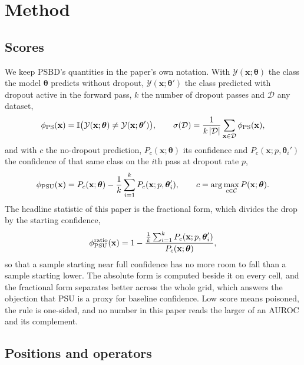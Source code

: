 \documentclass[../main.tex]{subfiles}
\begin{document}
\section{Method}

\subsection{Scores}

We keep PSBD's quantities in the paper's own notation. With $\mathcal{Y}(\mathbf{x};\boldsymbol\theta)$ the class the model $\boldsymbol\theta$ predicts without dropout, $\mathcal{Y}(\mathbf{x};\boldsymbol\theta')$ the class predicted with dropout active in the forward pass, $k$ the number of dropout passes and $\mathcal{D}$ any dataset,
\begin{equation}
\phi_{\mathrm{PS}}(\mathbf{x}) = \mathbb{I}\big(\mathcal{Y}(\mathbf{x};\boldsymbol\theta) \neq \mathcal{Y}(\mathbf{x};\boldsymbol\theta')\big),
\qquad
\sigma(\mathcal{D}) = \frac{1}{k\,|\mathcal{D}|} \sum_{\mathbf{x}\in\mathcal{D}} \phi_{\mathrm{PS}}(\mathbf{x}),
\end{equation}
and with $c$ the no-dropout prediction, $P_c(\mathbf{x};\boldsymbol\theta)$ its confidence and $P_c(\mathbf{x};p,\boldsymbol\theta_i')$ the confidence of that same class on the $i$th pass at dropout rate $p$,
\begin{equation}
\phi_{\mathrm{PSU}}(\mathbf{x}) = P_c(\mathbf{x};\boldsymbol\theta) - \frac{1}{k}\sum_{i=1}^{k} P_c(\mathbf{x};p,\boldsymbol\theta_i'),
\qquad
c = \arg\max_{c\in\mathcal{C}} P(\mathbf{x};\boldsymbol\theta).
\end{equation}
The headline statistic of this paper is the fractional form, which divides the drop by the starting confidence,
\begin{equation}
\phi_{\mathrm{PSU}}^{\mathrm{ratio}}(\mathbf{x}) = 1 - \frac{\frac{1}{k}\sum_{i=1}^{k} P_c(\mathbf{x};p,\boldsymbol\theta_i')}{P_c(\mathbf{x};\boldsymbol\theta)},
\end{equation}
so that a sample starting near full confidence has no more room to fall than a sample starting lower. The absolute form is computed beside it on every cell, and the fractional form separates better across the whole grid, which answers the objection that PSU is a proxy for baseline confidence. Low score means poisoned, the rule is one-sided, and no number in this paper reads the larger of an AUROC and its complement.

\subsection{Positions and operators}
\end{document}
